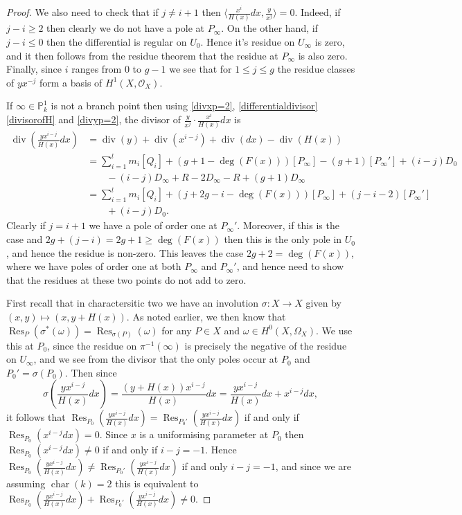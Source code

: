 \documentclass[draft, 11pt]{article} %
\theoremstyle{plain}
\theoremstyle{remark}
\newcommand{\ra}{\rightarrow}
\newcommand{\hzero}{{H^0(X,\Omega_X)}}
\newcommand{\hone}{H^1(X,\mathcal{O}_X)}
\DeclareMathOperator{\res}{Res}
\DeclareMathOperator{\di}{div}
\DeclareMathOperator{\cha}{char}
\begin{document}
\begin{proof}
We also need to check that if $j \neq i+1$ then $\langle \frac{x^i}{H(x)}dx, \frac{y}{x^j} \rangle = 0$.
Indeed, if $j-i \geq 2$ then clearly we do not have a pole at $P_\infty$.
On the other hand, if $j-i \leq 0$ then the differential is regular on $U_0$.
Hence it's residue on $U_\infty$ is zero, and it then follows from the residue theorem that the residue at $P_\infty$ is also zero.
Finally, since $i$ ranges from $0$ to $g-1$ we see that for $1\leq j \leq g$ the residue classes of $yx^{-j}$ form a basis of $\hone$.

If $\infty \in \mathbb P_k^1$ is not a branch point then using \eqref{divxp=2}, \eqref{differentialdivisor} \eqref{divisorofH} and \eqref{divyp=2}, the divisor of $\frac{y}{x^j} \cdot \frac{x^i }{H(x)}dx$ is
\begin{align*}
\di\left( \frac{yx^{i-j}}{H(x)}dx \right) & = \di(y) + \di(x^{i-j}) + \di( dx) - \di(H(x)) \\
& = \sum_{i=1}^l m_i[Q_i] + (g+1-\deg(F(x)))[P_\infty] - (g+1)[P_\infty'] + (i-j)D_0 \\
& \qquad - (i-j)D_\infty + R - 2D_\infty - R + (g+1)D_\infty \\
& = \sum_{i=1}^l m_i[Q_i] + (j+2g-i-\deg(F(x)))[P_\infty] + (j - i -2)[P_\infty'] \\
&  \qquad + (i-j)D_0.
\end{align*}
Clearly if $j=i+1$ we have a pole of order one at $P_\infty'$.
Moreover, if this is the case and $2g+(j-i) = 2g+1 \geq \deg(F(x))$ then this is the only pole in $U_0$, and hence the residue is non-zero.
This leaves the case $2g+2 =  \deg(F(x))$, where we have poles of order one at both $P_\infty$ and $P_\infty'$, and hence need to show that the residues at these two points do not add to zero.

First recall that in charactersitic two we have an involution $\sigma \colon X \ra X$ given by $(x,y) \mapsto (x, y + H(x))$.
As noted earlier, we then know that $\res_P(\sigma^*(\omega)) = \res_{\sigma(P)}(\omega)$ for any $P \in X$ and $\omega\in \hzero$.
We use this at $P_0$, since the residue on $\pi^{-1}(\infty)$ is precisely the negative of the residue on $U_\infty$, and we see from the divisor that the only poles occur at $P_0$ and $P_0' = \sigma (P_0)$.
Then since 
\[
\sigma \left( \frac{yx^{i-j}}{H(x)}dx \right) = \frac{(y+H(x))x^{i-j}}{H(x)}dx = \frac{yx^{i-j}}{H(x)}dx + x^{i-j}dx,
\]
it follows that $\res_{P_0} \left( \frac{yx^{i-j}}{H(x)}dx \right) = \res_{P_0'} \left( \frac{yx^{i-j}}{H(x)}dx \right)$ if and only if $\res_{P_0}(x^{i-j}dx) = 0$.
Since $x$ is a uniformising parameter at $P_0$ then $\res_{P_0}(x^{i-j}dx) \neq 0$ if and only if $i-j = -1$.
Hence $\res_{P_0} \left( \frac{yx^{i-j}}{H(x)}dx \right) \neq \res_{P_0'} \left( \frac{yx^{i-j}}{H(x)}dx \right)$ if and only $i-j=-1$, and since we are assuming $\cha(k) = 2$ this is equivalent to $\res_{P_0} \left( \frac{yx^{i-j}}{H(x)}dx \right) +\res_{P_0'} \left( \frac{yx^{i-j}}{H(x)}dx \right) \neq 0$.
\end{proof}
\end{document}
